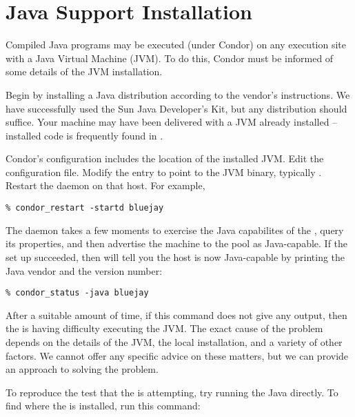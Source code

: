 \section{\label{sec:java-install}Java Support Installation}


Compiled Java programs may be executed (under Condor) on
any
execution site with a
Java Virtual Machine (JVM).
To do this,
Condor must be informed of some details of the
JVM installation.

Begin by installing a Java distribution according to the vendor's
instructions.
We have successfully used the Sun Java Developer's Kit,
but any distribution should suffice.
Your machine may have
been delivered with a JVM already installed -- installed code
is frequently found in .

Condor's configuration includes the location of the installed
JVM.
Edit the configuration file.
Modify the  entry to point to the JVM binary,
typically .
Restart the  daemon on that host.  For example,

\begin{verbatim}
% condor_restart -startd bluejay
\end{verbatim}

The  daemon takes a few moments to exercise the Java
capabilites of the , query its properties,
and then advertise the machine
to the pool as Java-capable.
If the set up succeeded, then  will
tell you the host is now Java-capable by printing the Java
vendor and the version number:

\begin{verbatim}
% condor_status -java bluejay
\end{verbatim}

After a suitable amount of time, if this command does not give any output,
then the   is having difficulty executing the JVM.
The exact cause of the problem depends on the details of the
JVM, the local installation, and a variety of other factors.
We cannot offer any specific advice on these matters, but
we can provide an approach to solving the problem.


To reproduce the test that the  is attempting,
try running the Java  directly.  To find
where the  is installed, run this command:

